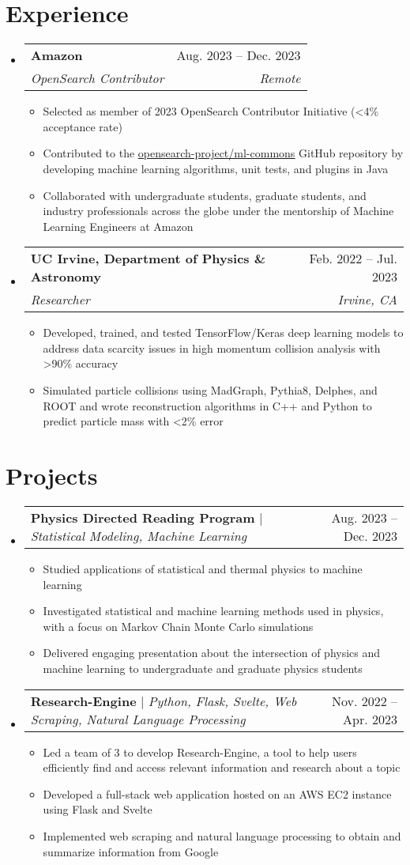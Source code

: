 \documentclass[letterpaper,11pt]{article}
\makeatletter
\newcommand{\resumeItem}[1]{
  \item\small{
    {#1 \vspace{-2pt}}
  }
}
\newcommand{\resumeSubheading}[4]{
  \vspace{-2pt}\item
    \begin{tabular*}{0.97\textwidth}[t]{l@{\extracolsep{\fill}}r}
      \textbf{#1} & #2 \\
      \textit{\small#3} & \textit{\small #4} \\
    \end{tabular*}\vspace{-7pt}
}
\newcommand{\resumeProjectHeading}[2]{
    \item
    \begin{tabular*}{0.97\textwidth}{l@{\extracolsep{\fill}}r}
      \small#1 & #2 \\
    \end{tabular*}\vspace{-7pt}
}
\newcommand{\resumeSubHeadingListStart}{\begin{itemize}[leftmargin=0.15in, label={}]}
\newcommand{\resumeSubHeadingListEnd}{\end{itemize}}
\newcommand{\resumeItemListStart}{\begin{itemize}}
\newcommand{\resumeItemListEnd}{\end{itemize}\vspace{-5pt}}
\makeatother
\begin{document}
\section{Experience}
  \resumeSubHeadingListStart
    \resumeSubheading
      {Amazon}{Aug. 2023 -- Dec. 2023}
      {OpenSearch Contributor}{Remote}
      \resumeItemListStart
        \resumeItem{Selected as member of 2023 OpenSearch Contributor Initiative (\textless 4\% acceptance rate)}
        \resumeItem{Contributed to the \href{https://github.com/opensearch-project/ml-commons/}{\underline{opensearch-project/ml-commons}} GitHub repository by developing machine learning algorithms, unit tests, and plugins in Java}
        \resumeItem{Collaborated with undergraduate students, graduate students, and industry professionals across the globe under the mentorship of Machine Learning Engineers at Amazon}
      \resumeItemListEnd
  \resumeSubHeadingListEnd

  \resumeSubHeadingListStart
    \resumeSubheading
      {UC Irvine, Department of Physics \& Astronomy}{Feb. 2022 -- Jul. 2023}
      {Researcher}{Irvine, CA}
      \resumeItemListStart
        \resumeItem{Developed, trained, and tested TensorFlow/Keras deep learning models to address data scarcity issues in high momentum collision analysis with \textgreater 90\% accuracy}
        \resumeItem{Simulated particle collisions using MadGraph, Pythia8, Delphes, and ROOT and wrote reconstruction algorithms in C++ and Python to predict particle mass with \textless 2\% error}
      \resumeItemListEnd
  \resumeSubHeadingListEnd

\section{Projects}
  \resumeSubHeadingListStart
    \resumeProjectHeading
      {\textbf{Physics Directed Reading Program} $|$ \emph{Statistical Modeling, Machine Learning}}{Aug. 2023 -- Dec. 2023}
      \resumeItemListStart
        \resumeItem{Studied applications of statistical and thermal physics to machine learning}
        \resumeItem{Investigated statistical and machine learning methods used in physics, with a focus on Markov Chain Monte Carlo simulations}
        \resumeItem{Delivered engaging presentation about the intersection of physics and machine learning to undergraduate and graduate physics students}
      \resumeItemListEnd
  \resumeSubHeadingListEnd

  \resumeSubHeadingListStart
    \resumeProjectHeading
      {\textbf{Research-Engine} $|$ \emph{Python, Flask, Svelte, Web Scraping, Natural Language Processing}}{Nov. 2022 -- Apr. 2023}
      \resumeItemListStart
        \resumeItem{Led a team of 3 to develop Research-Engine, a tool to help users efficiently find and access relevant information and research about a topic}
        \resumeItem{Developed a full-stack web application hosted on an AWS EC2 instance using Flask and Svelte}
        \resumeItem{Implemented web scraping and natural language processing to obtain and summarize information from Google}
      \resumeItemListEnd
  \resumeSubHeadingListEnd
\end{document}
